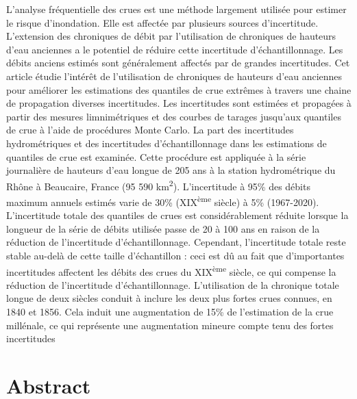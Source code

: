L'analyse fréquentielle des crues est une méthode largement utilisée pour estimer le risque d'inondation. Elle est affectée par plusieurs sources d'incertitude. L'extension des chroniques de débit par l'utilisation de chroniques de hauteurs d'eau anciennes a le potentiel de réduire cette incertitude d'échantillonnage. Les débits anciens estimés sont généralement affectés par de grandes incertitudes. Cet article étudie l'intérêt de l'utilisation de chroniques de hauteurs d'eau anciennes pour améliorer les estimations des quantiles de crue extrêmes à travers une chaine de propagation diverses incertitudes. Les incertitudes sont estimées et propagées à partir des mesures limnimétriques et des courbes de tarages jusqu'aux quantiles de crue à l'aide de procédures Monte Carlo. La part des incertitudes hydrométriques et des incertitudes d'échantillonnage dans les estimations de quantiles de crue est examinée. Cette procédure est appliquée à la série journalière de hauteurs d'eau longue de 205 ans à la station hydrométrique du Rhône à Beaucaire, France (95 590 km\textsuperscript{2}). L'incertitude à 95\% des débits maximum annuels estimés varie de 30\% (XIX\textsuperscript{ème} siècle) à 5\% (1967-2020). L'incertitude totale des quantiles de crues est considérablement réduite lorsque la longueur de la série de débits utilisée passe de 20 à 100 ans en raison de la réduction de l'incertitude d'échantillonnage. Cependant, l'incertitude totale reste stable au-delà de cette taille d'échantillon : ceci est dû au fait que d'importantes incertitudes affectent les débits des crues du XIX\textsuperscript{ème} siècle, ce qui compense la réduction de l'incertitude d'échantillonnage. L'utilisation de la chronique totale longue de deux siècles conduit à inclure les deux plus fortes crues connues, en 1840 et 1856. Cela induit une augmentation de 15\% de l'estimation de la crue millénale, ce qui représente une augmentation mineure compte tenu des fortes incertitudes

\section{Abstract}
    
